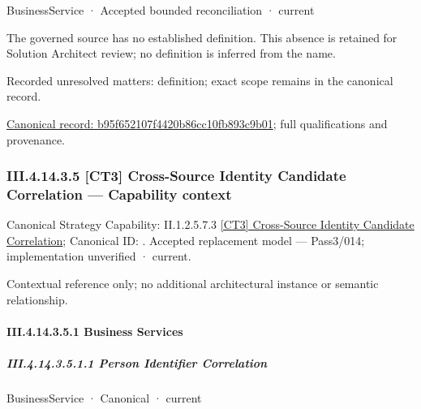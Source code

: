 \label{element:b95f652107f4420b86cc10fb893c9b01}
{\small BusinessService · Accepted bounded reconciliation · current}\par

The governed source has no established definition. This absence is retained for Solution Architect review; no definition is inferred from the name.


{\small Recorded unresolved matters: definition; exact scope remains in the canonical record.}\par
{\footnotesize \href{../../../../continuum/business/business-service/b95f652107f4420b86cc10fb893c9b01.md}{Canonical record: b95f652107f4420b86cc10fb893c9b01}; full qualifications and provenance.}\par
\subsubsection*{III.4.14.3.5 [CT3] Cross-Source Identity Candidate Correlation — Capability context}
\label{navigation:III.4.14.3.5}

{\small Canonical Strategy Capability: II.1.2.5.7.3 \hyperref[element:60d97cd46fde4349864aa737526f08cb]{[CT3] Cross-Source Identity Candidate Correlation}; Canonical ID: \texttt{}. Accepted replacement model — Pass3/014; implementation unverified · current.}\par
Contextual reference only; no additional architectural instance or semantic relationship.\par
\paragraph*{III.4.14.3.5.1 Business Services}
\label{navigation:III.4.14.3.5.1}

\subparagraph*{III.4.14.3.5.1.1 Person Identifier Correlation}
\label{navigation:III.4.14.3.5.1.1}

\label{element:71220901361e42f686faf7d852f57e45}
{\small BusinessService · Canonical · current}\par

